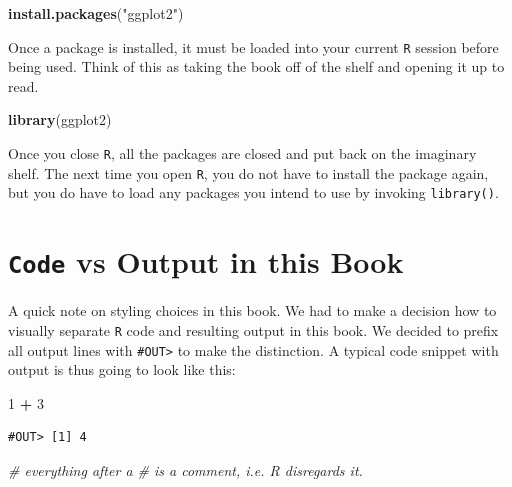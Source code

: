 \documentclass[]{book}
\newenvironment{Shaded}{\begin{snugshade}}{\end{snugshade}}
\newcommand{\CommentTok}[1]{\textcolor[rgb]{0.56,0.35,0.01}{\textit{#1}}}
\newcommand{\DecValTok}[1]{\textcolor[rgb]{0.00,0.00,0.81}{#1}}
\newcommand{\KeywordTok}[1]{\textcolor[rgb]{0.13,0.29,0.53}{\textbf{#1}}}
\newcommand{\NormalTok}[1]{#1}
\newcommand{\OperatorTok}[1]{\textcolor[rgb]{0.81,0.36,0.00}{\textbf{#1}}}
\newcommand{\StringTok}[1]{\textcolor[rgb]{0.31,0.60,0.02}{#1}}
\begin{document}
\begin{Shaded}
\begin{Highlighting}[]
\KeywordTok{install.packages}\NormalTok{(}\StringTok{"ggplot2"}\NormalTok{)}
\end{Highlighting}
\end{Shaded}

Once a package is installed, it must be loaded into your current \texttt{R} session before being used. Think of this as taking the book off of the shelf and opening it up to read.

\begin{Shaded}
\begin{Highlighting}[]
\KeywordTok{library}\NormalTok{(ggplot2)}
\end{Highlighting}
\end{Shaded}

Once you close \texttt{R}, all the packages are closed and put back on the imaginary shelf. The next time you open \texttt{R}, you do not have to install the package again, but you do have to load any packages you intend to use by invoking \texttt{library()}.

\hypertarget{code-output}{%
\section{\texorpdfstring{\texttt{Code} vs Output in this Book}{Code vs Output in this Book}}\label{code-output}}

A quick note on styling choices in this book. We had to make a decision how to visually separate \texttt{R} code and resulting output in this book. We decided to prefix all output lines with \texttt{\#OUT\textgreater{}} to make the distinction. A typical code snippet with output is thus going to look like this:

\begin{Shaded}
\begin{Highlighting}[]
\DecValTok{1} \OperatorTok{+}\StringTok{ }\DecValTok{3}
\end{Highlighting}
\end{Shaded}

\begin{verbatim}
#OUT> [1] 4
\end{verbatim}

\begin{Shaded}
\begin{Highlighting}[]
\CommentTok{# everything after a # is a comment, i.e. R disregards it.}
\end{Highlighting}
\end{Shaded}
\end{document}
